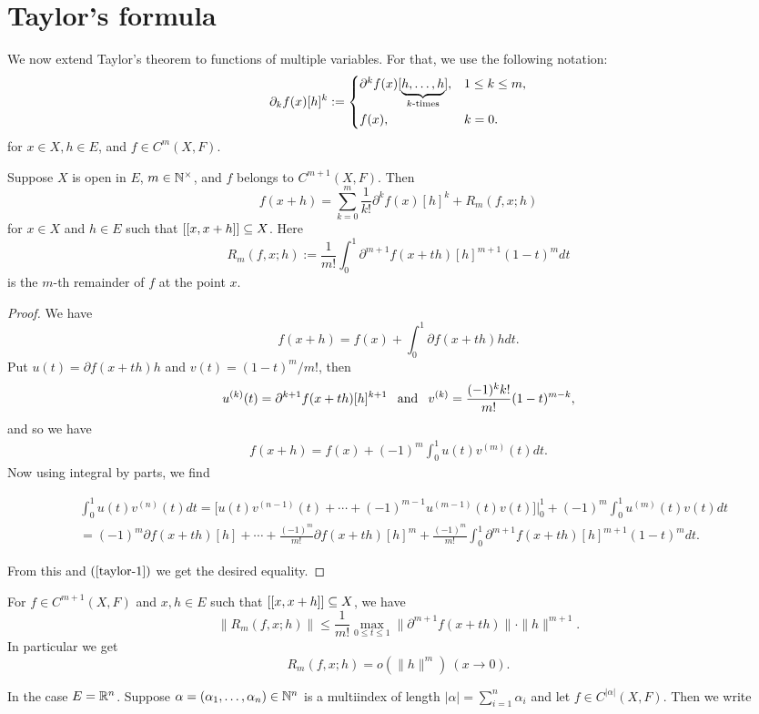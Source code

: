 \section{Taylor's formula}
We now extend Taylor's theorem to functions of multiple variables. For that, we
use the following notation:
\[\partial_k f(x)[h]^k:=\begin{cases*}
\partial^k f(x)[\underbrace{h,\dots,h}_\text{$k$-times}], &$1\leq k\leq m$,\\
f(x), &$k=0$.
\end{cases*}\]
for $x\in X,h\in E$, and $f\in C^m(X,F)$.
\begin{theorem}\label{Taylor formula}
Suppose $X$ is open in $E$, $m\in\mathbb{N}^{\times}$, and $f$ belongs to $C^{m+1}(X,F)$. Then
\[f(x+h)=\sum_{k=0}^{m}\dfrac{1}{k!}\partial^kf(x)[h]^k+R_m(f,x;h)\]
for $x\in X$ and $h\in E$ such that $[[x,x+h]]\subseteq X$. Here
\[R_m(f,x;h):=\dfrac{1}{m!}\int_{0}^{1}\partial^{m+1}f(x+th)[h]^{m+1}(1-t)^{m}dt\]
is the $m$-th remainder of $f$ at the point $x$.
\end{theorem}
\begin{proof}
We have
\[f(x+h)=f(x)+\int_{0}^{1}\partial f(x+th)hdt.\]
Put $u(t)=\partial f(x+th)h$ and $v(t)=(1-t)^m/m!$, then \[u^{(k)}(t)=\partial^{k+1}f(x+th)[h]^{k+1}\hspace{8pt}\text{and}\hspace{8pt} v^{(k)}=\frac{(-1)^kk!}{m!}(1-t)^{m-k},\]
and so we have
\begin{align}\label{taylor-1}
f(x+h)=f(x)+(-1)^m\int_{0}^{1}u(t)v^{(m)}(t)dt.
\end{align}
Now using integral by parts, we find
\begin{small}
\begin{align*}
&\int_{0}^{1}u(t)v^{(n)}(t)dt=\Big[u(t)v^{(n-1)}(t)+\cdots+(-1)^{m-1}u^{(m-1)}(t)v(t)\Big]\Big|_{0}^{1}+(-1)^m\int_{0}^{1}u^{(m)}(t)v(t)dt\\
&=(-1)^m\partial f(x+th)[h]+\cdots+\frac{(-1)^m}{m!}\partial f(x+th)[h]^m+\frac{(-1)^m}{m!}\int_{0}^{1}\partial^{m+1}f(x+th)[h]^{m+1}(1-t)^mdt.
\end{align*}
\end{small}
From this and $(\ref{taylor-1})$ we get the desired equality.
\end{proof}
\begin{remark}
For $f\in C^{m+1}(X,F)$ and $x,h\in E$ such that $[[x,x+h]]\subseteq X$, we have
\[\|R_m(f,x;h)\|\leq\dfrac{1}{m!}\max_{0\leq t\leq 1}\|\partial^{m+1}f(x+th)\|\cdot\|h\|^{m+1}.\]
In particular we get
\[R_m(f,x;h)=o(\|h\|^m)\ (x\to 0).\]
\end{remark}
In the case $E=\mathbb{R}^n$. Suppose $\alpha=(\alpha_1,\dots,\alpha_n)\in\mathbb{N}^n$ is a multiindex of length $|\alpha|=\sum_{i=1}^{n}\alpha_i$ and let $f\in C^{|\alpha|}(X,F)$. Then we write
